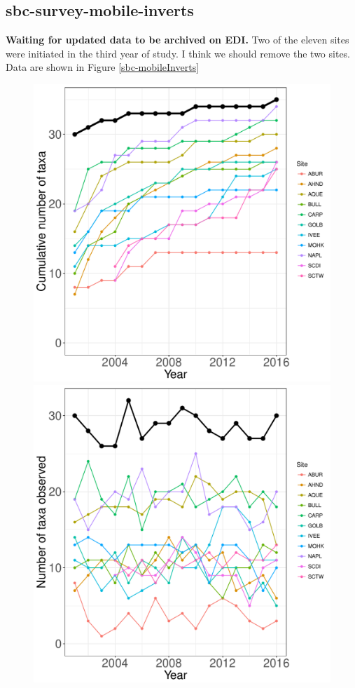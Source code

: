 \documentclass[11pt, oneside]{article}
\begin{document}
\subsection {sbc-survey-mobile-inverts}
{\bf Waiting for updated data to be archived on EDI.}
Two of the eleven sites were initiated in the third year of study.
I think we should remove the two sites.
Data are shown in Figure \ref{sbc-mobileInverts}

\begin{figure}[h!]
\centering
\includegraphics[scale = 0.4]{sbc-mobileInverts-castorani_species_accumulation_curve.pdf}
\includegraphics[scale = 0.4]{sbc-mobileInverts-castorani_num_taxa_over_time.pdf}

\end{figure}
\end{document}
